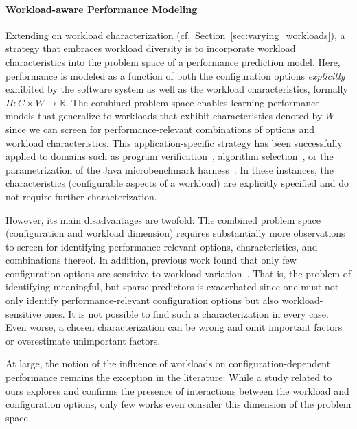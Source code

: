{\paragraph{Workload-aware Performance Modeling}
\label{sec:workload-aware}
Extending on workload characterization (cf.~Section~\ref{sec:varying_workloads}), a strategy that embraces workload diversity is to incorporate workload characteristics into the problem space of a performance prediction model. Here, performance is modeled as a function of both the configuration options \textit{explicitly} exhibited by the software system as well as the workload characteristics, formally $\Pi: C \times W \rightarrow \mathbb{R}$.
The combined problem space enables learning performance models that generalize to workloads that exhibit characteristics denoted by $W$ since we can screen for performance-relevant combinations of options and workload characteristics. {\color{brown}This application-specific strategy has been successfully applied to domains such as program verification~\cite{koc_satune_2021}, algorithm selection~\cite{kotthoff_algorithm_selection_2016}, or the parametrization of the Java microbenchmark harness~\cite{samoaa_workload_2021}. In these instances, the characteristics (configurable aspects of a workload) are explicitly specified and do not require further characterization.}

 However, its main disadvantages are twofold: The combined problem space (configuration and workload dimension) requires substantially more observations to screen for identifying performance-relevant options, characteristics, and combinations thereof. In addition, previous work  found that  only few configuration options are sensitive to workload variation~\cite{jamishidi_transfer_2017}. That is, the problem of identifying meaningful, but sparse predictors is exacerbated since one must not only identify performance-relevant configuration options but also workload-sensitive ones. It is not possible to find such a characterization in every case. Even worse, a chosen characterization can be wrong and omit important factors or overestimate unimportant factors.
 
 {\color{brown} At large, the notion of the influence of workloads on configuration-dependent performance remains the exception in the literature: While a study related to ours explores and confirms the presence of interactions between the workload and configuration options, only few works even consider this dimension of the problem space~\cite{lesoil_2021}. }


}

